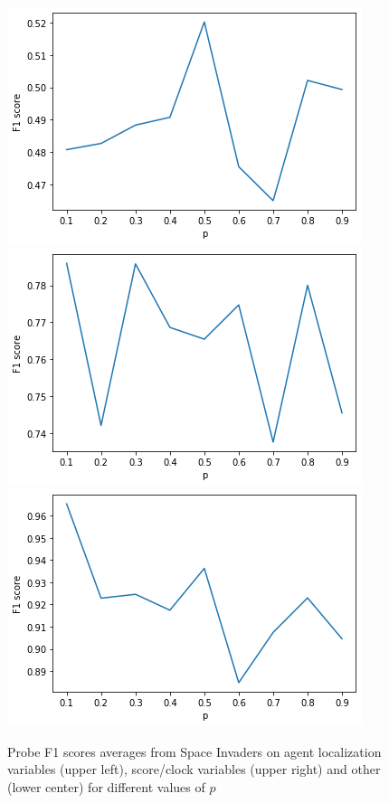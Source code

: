 \begin{figure}[H]
    \centering
    \includegraphics[scale=0.475]{../openreview/ablation2-agent_avg_f1.png}
    \includegraphics[scale=0.475]{../openreview/ablation2-score_avg_f1.png}
    \includegraphics[scale=0.475]{../openreview/ablation2-other_avg_f1.png}
    \caption{Probe F1 scores averages from Space Invaders on agent localization variables (upper left), score/clock variables (upper right) and other (lower center) for different values of $p$}
    \label{fig:ablation2-avg}
\end{figure}


